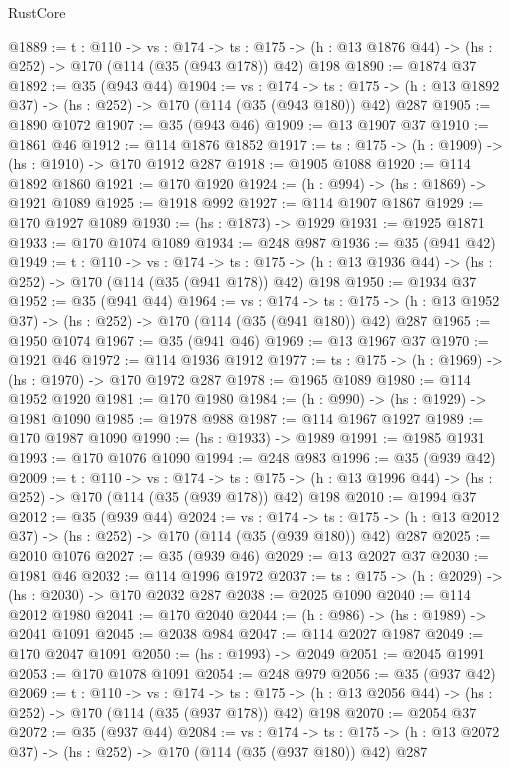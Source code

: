 \begin{lexlean}{RustCore}
\begin{coremodule}
@1889 := {t : @110} ->
  {vs : @174} ->
  {ts : @175} -> (h : @13 @1876 @44) -> (hs : @252) -> @170 (@114 (@35 (@943 @178)) @42) @198
@1890 := @1874 @37
@1892 := @35 (@943 @44)
@1904 := {vs : @174} ->
  {ts : @175} -> (h : @13 @1892 @37) -> (hs : @252) -> @170 (@114 (@35 (@943 @180)) @42) @287
@1905 := @1890 @1072
@1907 := @35 (@943 @46)
@1909 := @13 @1907 @37
@1910 := @1861 @46
@1912 := @114 @1876 @1852
@1917 := {ts : @175} -> (h : @1909) -> (hs : @1910) -> @170 @1912 @287
@1918 := @1905 @1088
@1920 := @114 @1892 @1860
@1921 := @170 @1920
@1924 := (h : @994) -> (hs : @1869) -> @1921 @1089
@1925 := @1918 @992
@1927 := @114 @1907 @1867
@1929 := @170 @1927 @1089
@1930 := (hs : @1873) -> @1929
@1931 := @1925 @1871
@1933 := @170 @1074 @1089
@1934 := @248 @987
@1936 := @35 (@941 @42)
@1949 := {t : @110} ->
  {vs : @174} ->
  {ts : @175} -> (h : @13 @1936 @44) -> (hs : @252) -> @170 (@114 (@35 (@941 @178)) @42) @198
@1950 := @1934 @37
@1952 := @35 (@941 @44)
@1964 := {vs : @174} ->
  {ts : @175} -> (h : @13 @1952 @37) -> (hs : @252) -> @170 (@114 (@35 (@941 @180)) @42) @287
@1965 := @1950 @1074
@1967 := @35 (@941 @46)
@1969 := @13 @1967 @37
@1970 := @1921 @46
@1972 := @114 @1936 @1912
@1977 := {ts : @175} -> (h : @1969) -> (hs : @1970) -> @170 @1972 @287
@1978 := @1965 @1089
@1980 := @114 @1952 @1920
@1981 := @170 @1980
@1984 := (h : @990) -> (hs : @1929) -> @1981 @1090
@1985 := @1978 @988
@1987 := @114 @1967 @1927
@1989 := @170 @1987 @1090
@1990 := (hs : @1933) -> @1989
@1991 := @1985 @1931
@1993 := @170 @1076 @1090
@1994 := @248 @983
@1996 := @35 (@939 @42)
@2009 := {t : @110} ->
  {vs : @174} ->
  {ts : @175} -> (h : @13 @1996 @44) -> (hs : @252) -> @170 (@114 (@35 (@939 @178)) @42) @198
@2010 := @1994 @37
@2012 := @35 (@939 @44)
@2024 := {vs : @174} ->
  {ts : @175} -> (h : @13 @2012 @37) -> (hs : @252) -> @170 (@114 (@35 (@939 @180)) @42) @287
@2025 := @2010 @1076
@2027 := @35 (@939 @46)
@2029 := @13 @2027 @37
@2030 := @1981 @46
@2032 := @114 @1996 @1972
@2037 := {ts : @175} -> (h : @2029) -> (hs : @2030) -> @170 @2032 @287
@2038 := @2025 @1090
@2040 := @114 @2012 @1980
@2041 := @170 @2040
@2044 := (h : @986) -> (hs : @1989) -> @2041 @1091
@2045 := @2038 @984
@2047 := @114 @2027 @1987
@2049 := @170 @2047 @1091
@2050 := (hs : @1993) -> @2049
@2051 := @2045 @1991
@2053 := @170 @1078 @1091
@2054 := @248 @979
@2056 := @35 (@937 @42)
@2069 := {t : @110} ->
  {vs : @174} ->
  {ts : @175} -> (h : @13 @2056 @44) -> (hs : @252) -> @170 (@114 (@35 (@937 @178)) @42) @198
@2070 := @2054 @37
@2072 := @35 (@937 @44)
@2084 := {vs : @174} ->
  {ts : @175} -> (h : @13 @2072 @37) -> (hs : @252) -> @170 (@114 (@35 (@937 @180)) @42) @287

\end{coremodule}
\end{lexlean}
